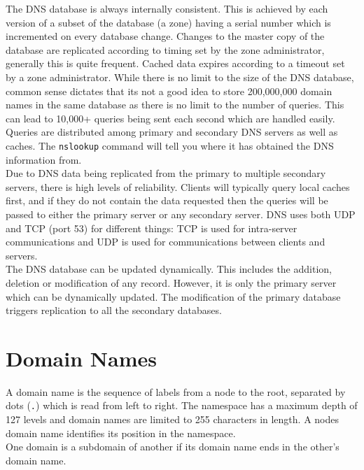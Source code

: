 The DNS database is always internally consistent. This is achieved by each version of a subset of the database (a zone) having a serial number which is incremented on every database change. Changes to the master copy of the database are replicated according to timing set by the zone administrator, generally this is quite frequent. Cached data expires according to a timeout set by a zone administrator. While there is no limit to the size of the DNS database, common sense dictates that its not a  good idea to store 200,000,000 domain names in the same database as there is no limit to the number of queries. This can lead to 10,000+ queries being sent each second which are handled easily. Queries are distributed among primary and secondary DNS servers as well as caches. The \verb|nslookup| command will tell you where it has obtained the DNS information from.\\

Due to DNS data being replicated from the primary to multiple secondary servers, there is high levels of reliability. Clients will typically query local caches first, and if they do not contain the data requested then the queries will be passed to either the primary server or any secondary server. DNS uses both UDP and TCP (port 53) for different things: TCP is used for intra-server communications and UDP is used for communications between clients and servers.\\

The DNS database can be updated dynamically. This includes the addition, deletion or modification of any record. However, it is only the primary server which can be dynamically updated. The modification of the primary database triggers replication to all the secondary databases.

\section{Domain Names}
A domain name is the sequence of labels from a node to the root, separated by dots (\verb|.|) which is read from left to right. The namespace has a maximum depth of 127 levels and domain names are limited to 255 characters in length. A nodes domain name identifies its position in the namespace.\\


One domain is a subdomain of another if its domain name ends in the other's domain name. 


